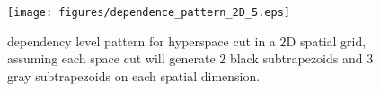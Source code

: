 {%


\begin{figure}[ht]
\centerline{\mbox{\texttt{[image: figures/dependence\_pattern\_2D\_5.eps]}}}
\caption{dependency level pattern for hyperspace cut in a $2$D spatial grid, assuming each space cut will generate $2$ black subtrapezoids and $3$ gray subtrapezoids on each spatial dimension.}
\label{fig:Dep2D5}
\end{figure}

}
